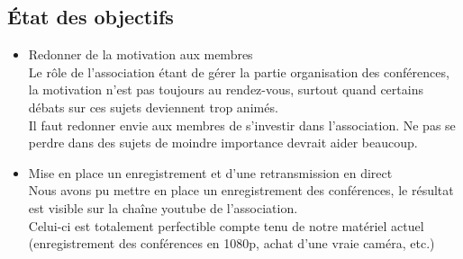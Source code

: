 \documentclass[12pt]{report}
\begin{document}
    \subsection{État des objectifs}
    \begin{itemize}
            \item Redonner de la motivation aux membres \\
                   Le rôle de l'association étant de gérer la partie
                   organisation des conférences, la motivation n'est pas
                   toujours au rendez-vous, surtout quand certains débats sur
                   ces sujets deviennent trop animés. \\
                   Il faut redonner envie aux membres de s'investir dans
                   l'association. Ne pas se perdre dans des sujets de moindre
                   importance devrait aider beaucoup.
            \item Mise en place un enregistrement et d'une retransmission en
                   direct\\
                   Nous avons pu mettre en place un enregistrement des
                   conférences, le résultat est visible sur la chaîne youtube
                   de l'association.\\
                   Celui-ci est totalement perfectible compte tenu de notre
                   matériel actuel (enregistrement des conférences en 1080p,
                   achat d'une vraie caméra, etc.)
    \end{itemize}
\end{document}
